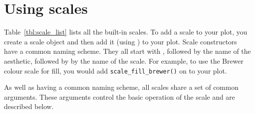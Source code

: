 \section{Using scales}
\label{sec:scale-usage}

Table~\ref{tbl:scale_list} lists all the built-in scales.  To add a scale to your plot, you create a scale object and then add it (using \code{+}) to your plot. Scale constructors have a common naming scheme.  They all start with , followed by the name of the aesthetic, followed by by the name of the scale. For example, to use the Brewer colour scale for fill, you would add {\tt scale\_fill\_brewer()} on to your plot.  

%

As well as having a common naming scheme, all scales share a set of common arguments.  These arguments control the basic operation of the scale and are described below.

